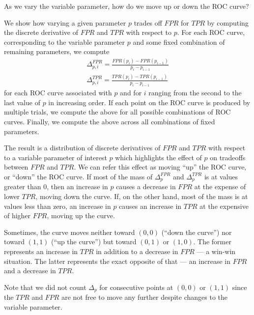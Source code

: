 As we vary the variable parameter, how do we move up or down the ROC curve?

We show how varying a given parameter $p$ trades off $FPR$ for $TPR$ by
computing the discrete derivative of $FPR$ and $TPR$ with respect to $p$. For
each ROC curve, corresponding to the variable parameter $p$ and some fixed
combination of remaining parameters, we compute
\begin{gather}
\Delta_{p,i}^{FPR} = \frac{FPR(p_{i}) - FPR(p_{i-1})}{p_i - p_{i-1}}\\
\Delta_{p,i}^{TPR} = \frac{TPR(p_{i}) - TPR(p_{i-1})}{p_i - p_{i-1}}
\end{gather}
for each ROC curve associated with $p$ and for $i$ ranging from the second to the last value
of $p$ in increasing order. If each point on the ROC curve is produced by
multiple trials, we compute the above for all possible combinations of ROC
curves. Finally, we compute the above across all combinations of fixed
parameters.

The result is a distribution of discrete derivatives of $FPR$ and $TPR$ with
respect to a variable parameter of interest $p$ which highlights the effect of
$p$ on tradeoffs between $FPR$ and $TPR$. We can refer this effect as moving
``up'' the ROC curve, or ``down'' the ROC curve. If most of the mass of
$\Delta_{p}^{FPR}$ and $\Delta_{p}^{TPR}$ is at values greater than 0, then an
increase in $p$ causes a decrease in $FPR$ at the expense of lower $TPR$, moving
down the curve. If, on the other hand, most of the mass is at values less than
zero, an increase in $p$ causes an increase in $TPR$ at the expensive of higher
$FPR$, moving up the curve.

Sometimes, the curve moves neither toward $(0,0)$ (``down the curve'') nor
toward $(1,1)$ (``up the curve'') but toward $(0,1)$ or $(1,0)$. The former
represents an increase in $TPR$ in addition to a decrease in $FPR$ --- a win-win
situation. The latter represents the exact opposite of that --- an increase in
$FPR$ and a decrease in $TPR$.

Note that we did not count $\Delta_p$ for consecutive points at $(0,0)$ or
$(1,1)$ since the $TPR$ and $FPR$ are not free to move any further despite
changes to the variable parameter.

